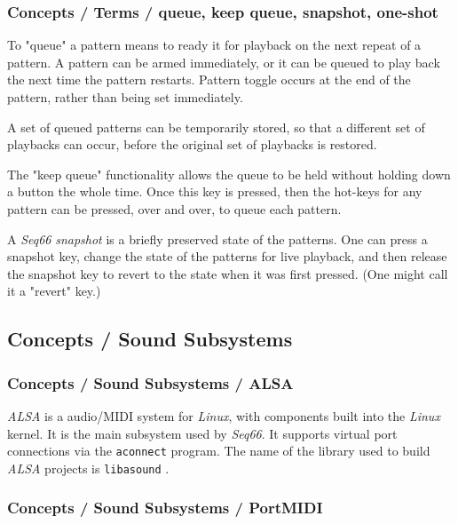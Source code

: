 \subsubsection{Concepts / Terms / queue, keep queue, snapshot, one-shot}
\label{subsubsec:concepts_terms_queue_mode}

   To "queue" a pattern means to ready it for playback on the next repeat of
   a pattern.  A pattern can be armed immediately, or it can be queued to
   play back the next time the pattern restarts.
   Pattern toggle occurs at the end of the pattern,
   rather than being set immediately.

   A set of queued patterns can be temporarily stored, so that a different
   set of playbacks can occur, before the original set of playbacks is
   restored.

   The "keep queue" functionality allows the queue to be held without
   holding down a button the whole time.  Once this key is pressed,
   then the hot-keys for any pattern can be pressed, over and over,
   to queue each pattern.

   A \textsl{Seq66} \textsl{snapshot} is a briefly preserved
   state of the patterns.  One can press a snapshot key, change the state of
   the patterns for live playback, and then release the snapshot key to
   revert to the state when it was first pressed.  (One might call it a
   "revert" key.)

\subsection{Concepts / Sound Subsystems}
\label{subsec:concepts_sound_subsystems}

\subsubsection{Concepts / Sound Subsystems / ALSA}
\label{subsubsec:concepts_sound_alsa}

   \textsl{ALSA} is a audio/MIDI system for \textsl{Linux}, with components built
   into the \textsl{Linux} kernel. It is the main subsystem used by
   \textsl{Seq66}.
   It supports virtual port connections via the \texttt{aconnect} program.
   The name of the library used to build
   \textsl{ALSA} projects is \texttt{libasound} \cite{alsa}.

\subsubsection{Concepts / Sound Subsystems / PortMIDI}
\label{subsubsec:concepts_sound_portmidi}

